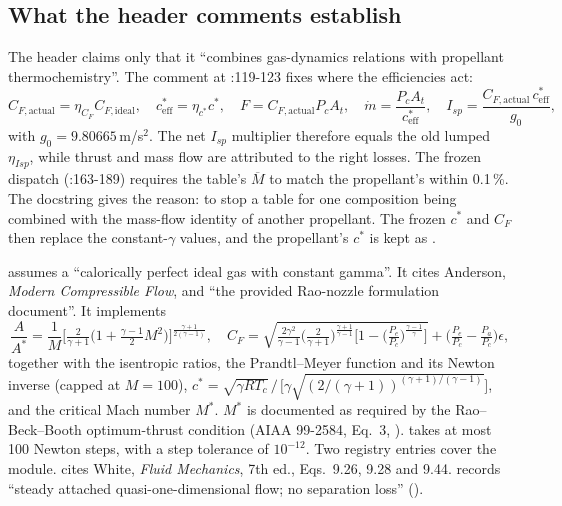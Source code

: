 \subsection{What the header comments establish}

The  header claims only that it ``combines gas-dynamics relations with propellant thermochemistry''. The comment at :119-123 fixes where the efficiencies act:
\[
C_{F,\text{actual}}=\eta_{C_F}C_{F,\text{ideal}},\quad
c^*_{\text{eff}}=\eta_{c^*}c^*,\quad
F=C_{F,\text{actual}}P_cA_t,\quad
\dot m=\frac{P_cA_t}{c^*_{\text{eff}}},\quad
I_{sp}=\frac{C_{F,\text{actual}}\,c^*_{\text{eff}}}{g_0},
\]
with $g_0=9.80665$\,m/s$^2$. The net $I_{sp}$ multiplier therefore equals the old lumped $\eta_{Isp}$, while thrust and mass flow are attributed to the right losses. The frozen dispatch (:163-189) requires the table's $\overline{M}$ to match the propellant's within 0.1\,\%. The docstring gives the reason: to stop a table for one composition being combined with the mass-flow identity of another propellant. The frozen $c^*$ and $C_F$ then replace the constant-$\gamma$ values, and the propellant's $c^*$ is kept as .

 assumes a ``calorically perfect ideal gas with constant gamma''. It cites Anderson, \emph{Modern Compressible Flow}, and ``the provided Rao-nozzle formulation document''. It implements
\[
\frac{A}{A^*}=\frac1M\Big[\tfrac{2}{\gamma+1}\big(1+\tfrac{\gamma-1}{2}M^2\big)\Big]^{\frac{\gamma+1}{2(\gamma-1)}},\quad
C_F=\sqrt{\tfrac{2\gamma^2}{\gamma-1}\big(\tfrac{2}{\gamma+1}\big)^{\frac{\gamma+1}{\gamma-1}}\Big[1-\big(\tfrac{P_e}{P_c}\big)^{\frac{\gamma-1}{\gamma}}\Big]}+\Big(\tfrac{P_e}{P_c}-\tfrac{P_a}{P_c}\Big)\epsilon,
\]
together with the isentropic ratios, the Prandtl--Meyer function and its Newton inverse (capped at $M=100$), $c^*=\sqrt{\gamma RT_c}\,/\,\big[\gamma\sqrt{(2/(\gamma+1))^{(\gamma+1)/(\gamma-1)}}\big]$, and the critical Mach number $M^*$. $M^*$ is documented as required by the Rao--Beck--Booth optimum-thrust condition (AIAA 99-2584, Eq.\ 3, ).  takes at most 100 Newton steps, with a step tolerance of $10^{-12}$. Two registry entries cover the module.  cites White, \emph{Fluid Mechanics}, 7th ed., Eqs.\ 9.26, 9.28 and 9.44.  records ``steady attached quasi-one-dimensional flow; no separation loss'' ().

